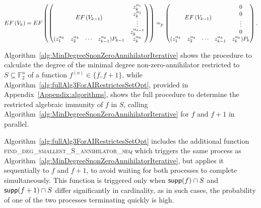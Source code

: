 \documentclass[11pt]{llncs}
\begin{document}
\begin{remark}\label{rem:echelonFormConstructingNextP}
    \begin{align*}
        EF\left(V_{k}\right) =
        EF
        \begin{pmatrix}
        \begin{pmatrix}
            \multicolumn{4}{c}{\multirow{4}{*}{$EF\left(V_{k-1}\right)$}} & z_k^{\alpha_1}\\
            & & & & z_k^{\alpha_2}\\
            & & & & \vdots\\
            & & & & z_{k}^{\alpha_{k-1}}\\
            (z_1^{\alpha_{k}} & z_2^{\alpha_{k}}& \cdots & z_{k-1}^{\alpha_{k}})P_{k-1} & z_{k}^{\alpha_k}
        \end{pmatrix}
        \end{pmatrix}
        =_p 
        \begin{pmatrix}
            \multicolumn{4}{c}{\multirow{4}{*}{$EF\left(V_{k-1}\right)$}} & 0\\
            & & & & 0\\
            & & & & \vdots\\
            & & & & 0\\
            (z_1^{\alpha_{k}} & z_2^{\alpha_{k}}& \cdots & z_{k-1}^{\alpha_{k}} & z_{k}^{\alpha_k})P_{k}
        \end{pmatrix}.
    \end{align*}
\end{remark}

Algorithm~\ref{alg:MinDegreeSnonZeroAnnihilatorIterative} shows the procedure to calculate the degree of the minimal degree non-zero-annihilator 
restricted to $S\subseteq \mathbb{F}_2^n$ of a function $f^{(o)} \in \{f, f+ 1\}$, while Algorithm~\ref{alg:fullAlg3ForAIRestrictesSetOpt}, provided in Appendix~\ref{Appendix:algorithms}, shows the full procedure to determine the restricted algebraic immunity of $f$ in $S$, calling Algorithm~\ref{alg:MinDegreeSnonZeroAnnihilatorIterative} for $f$ and $f+ 1$ in parallel.

Algorithm~\ref{alg:fullAlg3ForAIRestrictesSetOpt} includes the additional function \textsc{find\_deg\_smallest\_S\_annihilator\_seq} which triggers the same process as Algorithm~\ref{alg:MinDegreeSnonZeroAnnihilatorIterative}, but applies it sequentially to $f$ and $f + 1$, to avoid waiting for both processes to complete simultaneously. This function is triggered only when $\mathsf{supp}(f) \cap S$ and $\mathsf{supp}(f + 1) \cap S$ differ significantly in cardinality, as in such cases, the probability of one of the two processes terminating quickly is high.
\end{document}
